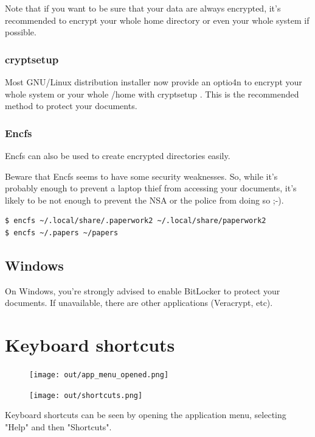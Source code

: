 \documentclass[10pt,a4paper]{article}
\begin{document}
Note that if you want to be sure that your data are always encrypted,
it's recommended to encrypt your whole home directory or even your whole system
if possible.

\subsubsection{cryptsetup}

Most GNU/Linux distribution installer now provide an optio4n to encrypt your
whole system or your whole /home with cryptsetup . This is the recommended
method to protect your documents.

\subsubsection{Encfs}

Encfs can also be used to create encrypted directories easily.

Beware that Encfs seems to have some security weaknesses. So, while it's
probably enough to prevent a laptop thief from accessing your documents, it's
likely to be not enough to prevent the NSA or the police from doing so ;-).

\begin{verbatim}
$ encfs ~/.local/share/.paperwork2 ~/.local/share/paperwork2
$ encfs ~/.papers ~/papers
\end{verbatim}


\subsection{Windows}

On Windows, you're strongly advised to enable BitLocker to protect your
documents. If unavailable, there are other applications (Veracrypt, etc).


\section{Keyboard shortcuts}

\begin{figure}[H]
	\texttt{[image: out/app\_menu\_opened.png]}
\end{figure}

\begin{figure}[H]
	\texttt{[image: out/shortcuts.png]}
\end{figure}

Keyboard shortcuts can be seen by opening the application menu, selecting
"Help" and then "Shortcuts".
\end{document}
